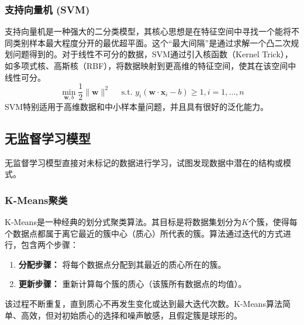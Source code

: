 \documentclass{SYSUReport}
\begin{document}
\subsubsection{支持向量机 (SVM)}
支持向量机是一种强大的二分类模型，其核心思想是在特征空间中寻找一个能将不同类别样本最大程度分开的最优超平面。这个“最大间隔”是通过求解一个凸二次规划问题得到的。对于线性不可分的数据，SVM通过引入核函数（Kernel Trick），如多项式核、高斯核（RBF），将数据映射到更高维的特征空间，使其在该空间中线性可分。
\begin{equation}
    \min_{\mathbf{w}, b} \frac{1}{2}\|\mathbf{w}\|^{2} \quad \text { s.t. } y_{i}\left(\mathbf{w} \cdot \mathbf{x}_{i}-b\right) \geq 1, i=1, \ldots, n
\end{equation}
SVM特别适用于高维数据和中小样本量问题，并且具有很好的泛化能力。

\subsection{无监督学习模型}
无监督学习模型直接对未标记的数据进行学习，试图发现数据中潜在的结构或模式。

\subsubsection{K-Means聚类}
K-Means是一种经典的划分式聚类算法。其目标是将数据集划分为$K$个簇，使得每个数据点都属于离它最近的簇中心（质心）所代表的簇。算法通过迭代的方式进行，包含两个步骤：
\begin{enumerate}
    \item \textbf{分配步骤：} 将每个数据点分配到其最近的质心所在的簇。
    \item \textbf{更新步骤：} 重新计算每个簇的质心（该簇所有数据点的均值）。
\end{enumerate}
该过程不断重复，直到质心不再发生变化或达到最大迭代次数。K-Means算法简单、高效，但对初始质心的选择和噪声敏感，且假定簇是球形的。
\end{document}
